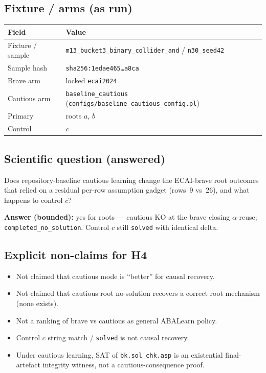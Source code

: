 \documentclass[11pt]{article}
\begin{document}
\subsection{Fixture / arms (as run)}

\begin{center}
\begin{tabular}{@{}lL{0.62\textwidth}@{}}
\toprule
Field & Value \\
\midrule
Fixture / sample & \texttt{m13\_bucket3\_binary\_collider\_and} / \texttt{n30\_seed42} \\
Sample hash & \texttt{sha256:1edae465\ldots a8ca} \\
Brave arm & locked \texttt{ecai2024} \\
Cautious arm & \texttt{baseline\_cautious} (\texttt{configs/baseline\_cautious\_config.pl}) \\
Primary & roots \(a\), \(b\) \\
Control & \(c\) \\
\bottomrule
\end{tabular}
\end{center}

\subsection{Scientific question (answered)}

Does repository-baseline cautious learning change the ECAI-brave root outcomes
that relied on a residual per-row assumption gadget (rows~9 vs~26), and what
happens to control \(c\)?

\textbf{Answer (bounded):} yes for roots --- cautious KO at the brave closing
\(\alpha\)-reuse; \texttt{completed\_no\_solution}.
Control \(c\) still \texttt{solved} with identical delta.

\subsection{Explicit non-claims for H4}

\begin{itemize}
  \item Not claimed that cautious mode is ``better'' for causal recovery.
  \item Not claimed that cautious root no-solution recovers a correct root
    mechanism (none exists).
  \item Not a ranking of brave vs cautious as general ABALearn policy.
  \item Control \(c\) string match / \texttt{solved} is not causal recovery.
  \item Under cautious learning, SAT of \texttt{bk.sol\_chk.asp} is an
    existential final-artefact integrity witness, not a cautious-consequence
    proof.
\end{itemize}
\end{document}
